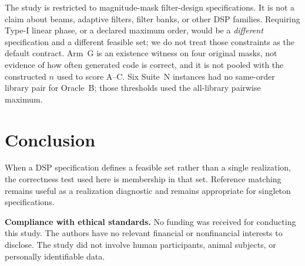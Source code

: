 \documentclass{article}
\begin{document}
The study is restricted to magnitude-mask filter-design
specifications.
It is not a claim about beams, adaptive filters, filter banks, or
other DSP families.
Requiring Type-I linear phase, or a declared maximum order, would be
a \emph{different} specification and a different feasible set; we do
not treat those constraints as the default contract.
Arm~G is an existence witness on four original masks, not evidence of
how often generated code is correct, and it is not pooled with the
constructed $n$ used to score A--C.
Six Suite~N instances had no same-order library pair for Oracle~B;
those thresholds used the all-library pairwise maximum.

\section{Conclusion}
\label{sec:conc}

When a DSP specification defines a feasible set rather than a single
realization, the correctness test used here is membership in that set.
Reference matching remains useful as a realization diagnostic and
remains appropriate for singleton specifications.

\vspace{4pt}
\noindent\textbf{Compliance with ethical standards.}
No funding was received for conducting this study.
The authors have no relevant financial or nonfinancial interests
to disclose.
The study did not involve human participants, animal subjects, or
personally identifiable data.



\end{document}
